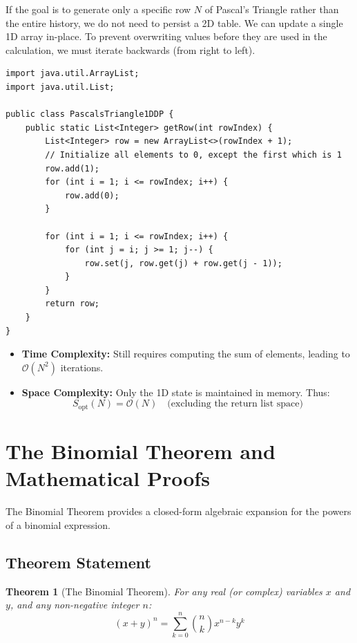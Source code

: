 \documentclass[10pt,journal,compsoc,onecolumn]{IEEEtran}
\newtheorem{theorem}{Theorem}
\begin{document}
If the goal is to generate only a specific row $N$ of Pascal's Triangle rather than the entire history, we do not need to persist a 2D table. We can update a single 1D array in-place. To prevent overwriting values before they are used in the calculation, we must iterate backwards (from right to left).

\begin{verbatim}
import java.util.ArrayList;
import java.util.List;

public class PascalsTriangle1DDP {
    public static List<Integer> getRow(int rowIndex) {
        List<Integer> row = new ArrayList<>(rowIndex + 1);
        // Initialize all elements to 0, except the first which is 1
        row.add(1);
        for (int i = 1; i <= rowIndex; i++) {
            row.add(0);
        }

        for (int i = 1; i <= rowIndex; i++) {
            for (int j = i; j >= 1; j--) {
                row.set(j, row.get(j) + row.get(j - 1));
            }
        }
        return row;
    }
}
\end{verbatim}

\begin{itemize}
    \item \textbf{Time Complexity:} Still requires computing the sum of elements, leading to $\mathcal{O}(N^2)$ iterations.
    \item \textbf{Space Complexity:} Only the 1D state is maintained in memory. Thus:
    \begin{equation}
    S_{\text{opt}}(N) = \mathcal{O}(N) \quad \text{(excluding the return list space)}
    \end{equation}
\end{itemize}

\section{The Binomial Theorem and Mathematical Proofs}
\label{sec:binomial}

The Binomial Theorem provides a closed-form algebraic expansion for the powers of a binomial expression.

\subsection{Theorem Statement}

\begin{theorem}[The Binomial Theorem]
For any real (or complex) variables $x$ and $y$, and any non-negative integer $n$:
\begin{equation}
(x + y)^n = \sum_{k=0}^{n} \binom{n}{k} x^{n - k} y^k
\end{equation}
\end{theorem}
\end{document}
